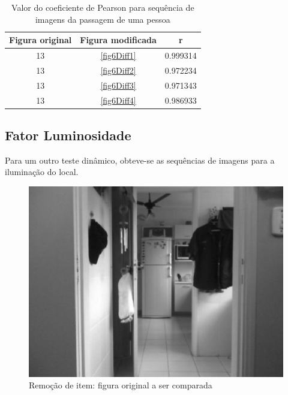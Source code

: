 \documentclass[10pt,a4paper]{article}
\begin{document}
\begin{table}[h!]
  \begin{center}
    \caption{Valor do coeficiente de Pearson para sequência de imagens
      da passagem de uma pessoa}
    \begin{tabular}{|c|c|c|}
      \hline
      Figura original & Figura modificada & r\\
      \hline
      13 &  \ref{fig6Diff1} & 0.999314\\
      13 &  \ref{fig6Diff2} & 0.972234\\
      13 &  \ref{fig6Diff3} & 0.971343\\
      13 &  \ref{fig6Diff4} & 0.986933\\
      \hline
    \end{tabular}
  \end{center}
\end{table}


\newpage
\subsection{Fator Luminosidade}
Para um outro teste dinâmico, obteve-se as sequências de imagens para
a iluminação do local.

\begin{figure}[h!]
  \begin{center}
    \includegraphics[scale=0.35]{photos/luzes/gBase}
    \caption{Remoção de item: figura original a ser comparada}
  \end{center}
  \label{luzes}
\end{figure}
\end{document}
